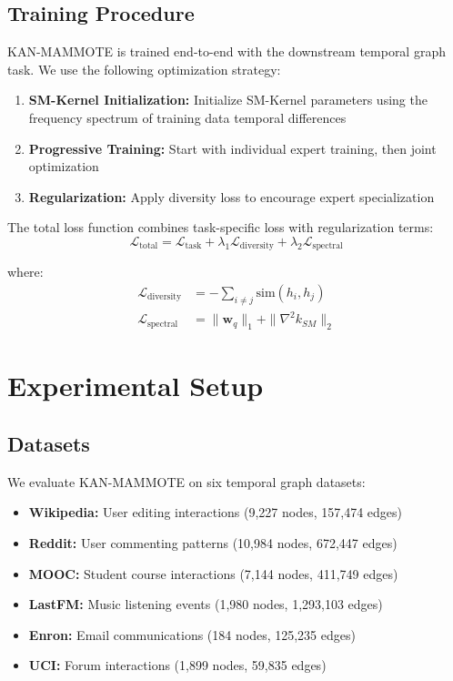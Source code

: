 \documentclass[conference]{IEEEtran}
\begin{document}
\subsection{Training Procedure}

KAN-MAMMOTE is trained end-to-end with the downstream temporal graph task. We use the following optimization strategy:

\begin{enumerate}
\item \textbf{SM-Kernel Initialization:} Initialize SM-Kernel parameters using the frequency spectrum of training data temporal differences
\item \textbf{Progressive Training:} Start with individual expert training, then joint optimization
\item \textbf{Regularization:} Apply diversity loss to encourage expert specialization
\end{enumerate}

The total loss function combines task-specific loss with regularization terms:
\begin{equation}
\mathcal{L}_{\text{total}} = \mathcal{L}_{\text{task}} + \lambda_1 \mathcal{L}_{\text{diversity}} + \lambda_2 \mathcal{L}_{\text{spectral}}
\end{equation}

where:
\begin{align}
\mathcal{L}_{\text{diversity}} &= -\sum_{i \neq j} \text{sim}(h_i, h_j) \\
\mathcal{L}_{\text{spectral}} &= \|\mathbf{w}_q\|_1 + \|\nabla^2 k_{SM}\|_2
\end{align}

\section{Experimental Setup}

\subsection{Datasets}

We evaluate KAN-MAMMOTE on six temporal graph datasets:
\begin{itemize}
\item \textbf{Wikipedia:} User editing interactions (9,227 nodes, 157,474 edges)
\item \textbf{Reddit:} User commenting patterns (10,984 nodes, 672,447 edges)
\item \textbf{MOOC:} Student course interactions (7,144 nodes, 411,749 edges)
\item \textbf{LastFM:} Music listening events (1,980 nodes, 1,293,103 edges)
\item \textbf{Enron:} Email communications (184 nodes, 125,235 edges)
\item \textbf{UCI:} Forum interactions (1,899 nodes, 59,835 edges)
\end{itemize}
\end{document}

